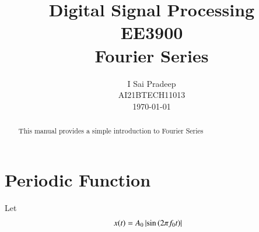 \documentclass[journal,12pt,twocolumn]{IEEEtran}
\begin{document}
\title{ Digital Signal Processing \\ \Large EE3900 \\ \vspace*{12pt} \textbf{Fourier Series}}
\author{I Sai Pradeep\\ \normalsize AI21BTECH11013 \\ \vspace*{20pt} \normalsize \today}
 \maketitle 
 \tableofcontents
 \begin{abstract}
    This manual provides a simple introduction to Fourier Series
    \end{abstract}
    \section{Periodic Function}
    Let 
    \begin{align}
        x(t) &= A_0\left\vert\sin\left(2\pi f_0 t\right)\right\vert
        \label{eq:x(t)}
    \end{align}
\end{document}
